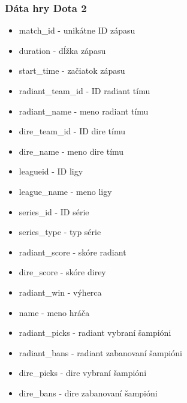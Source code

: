 \subsubsection{Dáta hry Dota 2}

 \begin{itemize}
\item match\_id - unikátne ID zápasu 
\item duration - dĺžka zápasu 
\item start\_time - začiatok zápasu 
\item radiant\_team\_id - ID radiant tímu 
\item radiant\_name - meno radiant tímu 
\item dire\_team\_id - ID dire tímu 
\item dire\_name - meno dire tímu 
\item leagueid - ID ligy
\item league\_name - meno ligy
\item series\_id - ID série
\item series\_type - typ série
\item radiant\_score - skóre radiant
\item dire\_score - skóre direy
\item radiant\_win - výherca
\item name - meno hráča
\item radiant\_picks - radiant vybraní šampióni
\item radiant\_bans - radiant zabanovaní šampióni
\item dire\_picks - dire vybraní šampióni
\item dire\_bans - dire zabanovaní šampióni
\end{itemize}

